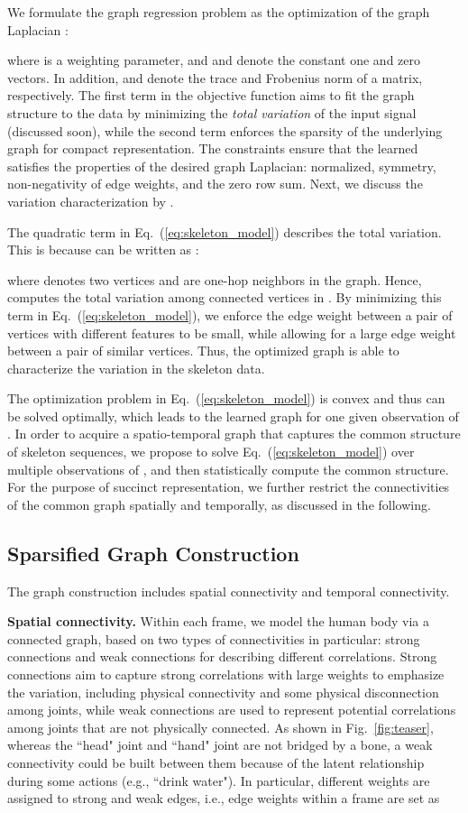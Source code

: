 \documentclass[conference]{IEEEtran}
\begin{document}
We formulate the graph regression problem as the optimization of the graph Laplacian :

where  is a weighting parameter, and  and  denote the constant one and zero vectors. In addition,  and  denote the trace and Frobenius norm of a matrix, respectively. The first term in the objective function aims to fit the graph structure to the data by minimizing the \textit{total variation} of the input signal (discussed soon), while the second term enforces the sparsity of the underlying graph for compact representation. The constraints ensure that the learned  satisfies the properties of the desired graph Laplacian: normalized, symmetry, non-negativity of edge weights, and the zero row sum. Next, we discuss the variation characterization by . 

The quadratic term  in Eq.~(\ref{eq:skeleton_model}) describes the total variation. This is because  can be written as \cite{yale04lect2}:

where  denotes two vertices  and  are one-hop neighbors in the graph. Hence,  computes the total variation among connected vertices in . By minimizing this term in Eq.~(\ref{eq:skeleton_model}), we enforce the edge weight between a pair of vertices with different features to be small, while allowing for a large edge weight between a pair of similar vertices. Thus, the optimized graph is able to characterize the variation in the skeleton data.   

The optimization problem in Eq.~(\ref{eq:skeleton_model}) is convex and thus can be solved optimally, which leads to the learned graph for one given observation of . In order to acquire a spatio-temporal graph that captures the common structure of skeleton sequences, we propose to solve Eq.~(\ref{eq:skeleton_model}) over multiple observations of , and then statistically compute the common structure. For the purpose of succinct representation, we further restrict the connectivities of the common graph spatially and temporally, as discussed in the following.  

\subsection{Sparsified Graph Construction}
\label{subsec:graph}
The graph construction includes spatial connectivity and temporal connectivity. 

\textbf{Spatial connectivity.} Within each frame, we model the human body via a connected graph, based on two types of connectivities in particular: strong connections  and weak connections  for describing different correlations. Strong connections aim to capture strong correlations with large weights to emphasize the variation, including physical connectivity and some physical disconnection among joints, while weak connections are used to represent potential correlations among joints that are not physically connected. As shown in Fig.~\ref{fig:teaser}, whereas the ``head" joint and ``hand" joint are not bridged by a bone, a weak connectivity could be built between them because of the latent relationship during some actions (e.g., ``drink water"). In particular, different weights are assigned to strong and weak edges, i.e., edge weights within a frame are set as 
\end{document}
